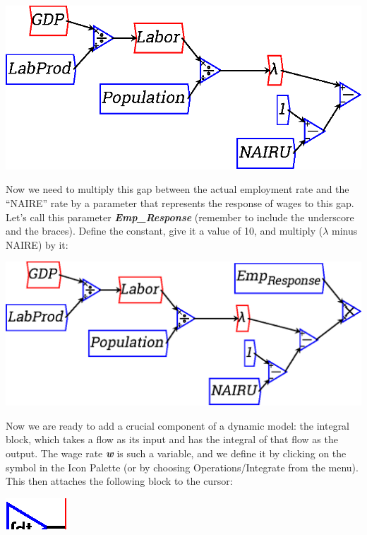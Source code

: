 \begin{center}
  \includegraphics{images/NewItem108.eps}
\end{center}

Now we need to multiply this gap between the actual employment rate
and the ``NAIRE'' rate by a parameter that represents the response of
wages to this gap. Let's call this parameter {\bf\em Emp\_{Response}} (remember to include the underscore and the braces). Define the constant, give it a value of 10, and multiply ($\lambda$ minus NAIRE) by it:

\begin{center}
\includegraphics{images/NewItem109.eps}
\end{center}

Now we are ready to add a crucial component of a dynamic model: the
integral block, which takes a flow as its input and has the integral
of that flow as the output. The wage rate {\bf\em w} is such a variable, and we
define it by clicking on the  symbol in the Icon Palette (or by
choosing Operations/Integrate from the menu). This then attaches the
following block to the cursor: 

\begin{center}
\includegraphics{images/NewItem39.eps}
\end{center}


